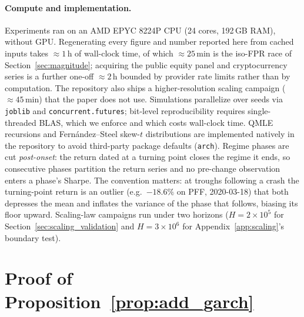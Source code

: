\documentclass[sigconf,anonymous,review]{acmart}
\theoremstyle{acmdefinition}
\begin{document}
\paragraph{Compute and implementation.}
Experiments ran on an AMD EPYC 8224P CPU (24 cores, 192\,GB RAM), without GPU. Regenerating every figure and number reported here from cached inputs takes ${\approx}1$\,h of wall-clock time, of which ${\approx}25$\,min is the iso-FPR race of Section~\ref{sec:magnitude}; acquiring the public equity panel and cryptocurrency series is a further one-off ${\approx}2$\,h bounded by provider rate limits rather than by computation. The repository also ships a higher-resolution scaling campaign (${\approx}45$\,min) that the paper does not use. Simulations parallelize over seeds via \texttt{joblib} and \texttt{concurrent.futures}; bit-level reproducibility requires single-threaded BLAS, which we enforce and which costs wall-clock time. QMLE recursions and Fern\'andez--Steel skew-$t$ distributions are implemented natively in the repository to avoid third-party package defaults (\texttt{arch}). Regime phases are cut \emph{post-onset}: the return dated at a turning point closes the regime it ends, so consecutive phases partition the return series and no pre-change observation enters a phase's Sharpe. The convention matters: at troughs following a crash the turning-point return is an outlier (e.g.\ $-18.6\%$ on PFF, 2020-03-18) that both depresses the mean and inflates the variance of the phase that follows, biasing its floor upward. Scaling-law campaigns run under two horizons ($H = 2\times10^5$ for Section~\ref{sec:scaling_validation} and $H = 3\times10^6$ for Appendix~\ref{app:scaling}'s boundary test).

\section{Proof of Proposition~\ref{prop:add_garch}}\label{app:garch}
\end{document}
